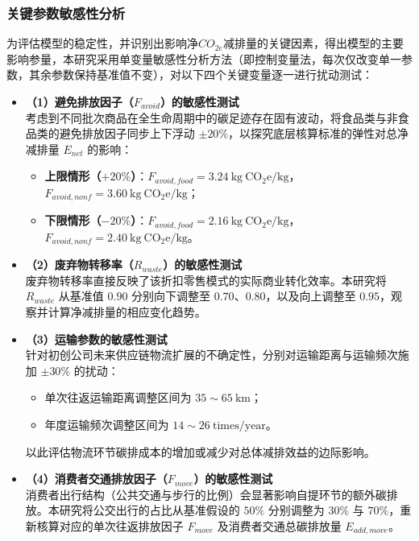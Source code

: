 \documentclass{article}
\begin{document}
\subsubsection{关键参数敏感性分析}

为评估模型的稳定性，并识别出影响净$CO_{2e}$减排量的关键因素，得出模型的主要影响参量，本研究采用单变量敏感性分析方法（即控制变量法，每次仅改变单一参数，其余参数保持基准值不变），对以下四个关键变量逐一进行扰动测试：

\begin{itemize}
    \item \textbf{（1）避免排放因子（$F_{avoid}$）的敏感性测试} \\
    考虑到不同批次商品在全生命周期中的碳足迹存在固有波动，将食品类与非食品类的避免排放因子同步上下浮动 $\pm 20\%$，以探究底层核算标准的弹性对总净减排量 $E_{net}$ 的影响：
    \begin{itemize}
        \item \textbf{上限情形（$+20\%$）}：$F_{avoid,food} = 3.24\ \mathrm{kg\ CO_2e/kg}$，$F_{avoid,nonf} = 3.60\ \mathrm{kg\ CO_2e/kg}$；
        \item \textbf{下限情形（$-20\%$）}：$F_{avoid,food} = 2.16\ \mathrm{kg\ CO_2e/kg}$，$F_{avoid,nonf} = 2.40\ \mathrm{kg\ CO_2e/kg}$。
    \end{itemize}
    
    \item \textbf{（2）废弃物转移率（$R_{waste}$）的敏感性测试} \\
    废弃物转移率直接反映了该折扣零售模式的实际商业转化效率。本研究将 $R_{waste}$ 从基准值 $0.90$ 分别向下调整至 $0.70$、$0.80$，以及向上调整至 $0.95$，观察并计算净减排量的相应变化趋势。

    \item \textbf{（3）运输参数的敏感性测试} \\
    针对初创公司未来供应链物流扩展的不确定性，分别对运输距离与运输频次施加 $\pm 30\%$ 的扰动：
    \begin{itemize}
        \item 单次往返运输距离调整区间为 $35 \sim 65\ \mathrm{km}$；
        \item 年度运输频次调整区间为 $14 \sim 26\ \mathrm{times/year}$。
    \end{itemize}
    以此评估物流环节碳排成本的增加或减少对总体减排效益的边际影响。
    
    \item \textbf{（4）消费者交通排放因子（$F_{move}$）的敏感性测试} \\
    消费者出行结构（公共交通与步行的比例）会显著影响自提环节的额外碳排放。本研究将公交出行的占比从基准假设的 $50\%$ 分别调整为 $30\%$ 与 $70\%$，重新核算对应的单次往返排放因子 $F_{move}$ 及消费者交通总碳排放量 $E_{add,move}$。
\end{itemize}
\end{document}
